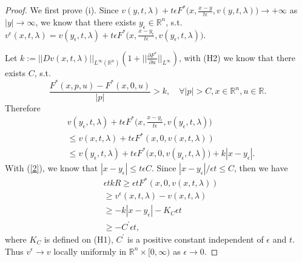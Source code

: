 \documentclass[preprint]{elsarticle}
\numberwithin{equation}{section}
\begin{document}
\begin{proof}
    We first prove (i). Since $v(y,t,\lambda)+t\epsilon F^*\big(x,\frac{x-y}{t\epsilon},v(y,t,\lambda)\big) \rightarrow +\infty$ as $|y| \rightarrow \infty$, we know that there exists $y_{\epsilon} \in \mathbb R^n$, s.t. $v^{\epsilon}(x,t,\lambda)= v(y_{\epsilon},t,\lambda)+t\epsilon F^*\big(x,\frac{x-y_{\epsilon}}{t\epsilon},v(y_{\epsilon},t,\lambda)\big)$. 
    
Let $k:=||Dv(x,t,\lambda)||_{L^{\infty}(\mathbb R^n)}(1+||\frac{\partial F^*}{\partial u}||_{L^{\infty}})$, with (H2) we know that there exists $C$, s.t.
    \begin{equation}
        \frac{F^*(x,p,u)-F^*(x,0,u)}{|p|}>k, \quad \forall |p|>C, x \in \mathbb R^n, u\in \mathbb R.\label{2}
    \end{equation}
    Therefore 
    \begin{align*}
        &v(y_{\epsilon},t,\lambda)+t\epsilon F^*\big(x,\frac{x-y_{\epsilon}}{t\epsilon},v(y_{\epsilon},t,\lambda)\big)\\
        & \leq v(x,t,\lambda)+t\epsilon F^*(x,0,v(x,t,\lambda))\\
        & \leq  v(y_{\epsilon},t,\lambda)+t\epsilon F^*\big(x,0,v(y_{\epsilon},t,\lambda)\big)+k|x-y_{\epsilon}|.
    \end{align*}
    With (\ref{2}), we know that $|x-y_{\epsilon}| \leq t\epsilon C$. Since $|x-y_{\epsilon}|/\epsilon t \leq C$, then we have
    \begin{align*}
        &\epsilon tkR \geq \epsilon t F^*(x,0,v(x,t,\lambda))\\
        &\geq v^{\epsilon}(x,t,\lambda)-v(x,t,\lambda)\\
        &\geq -k|x-y_{\epsilon}|-K_C \epsilon t\\
        &\geq -C^{\prime}\epsilon t,
    \end{align*}
    where $K_C$ is defined on (H1), $C^{\prime}$ is a positive constant independent of $\epsilon$ and $t$. Thus $v^{\epsilon} \rightarrow v$ locally uniformly in $\mathbb R^n \times [0,\infty)$ as $\epsilon \rightarrow 0$.
    

\end{proof}
\end{document}
